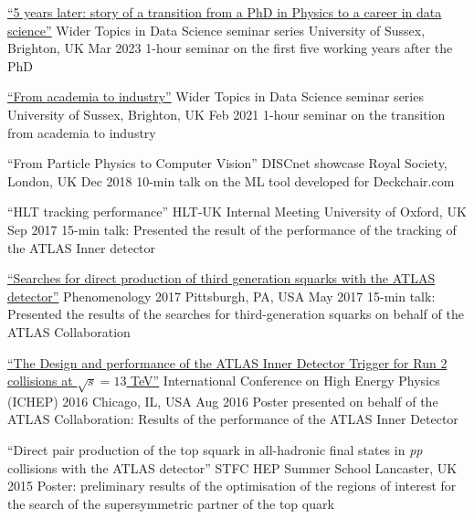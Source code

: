 \begin{cventries}
  \cventry
    {\href{https://www.linkedin.com/in/fabriziomiano/}{``5 years later: story of a transition from a PhD in Physics to a career in data science''}}
    {Wider Topics in Data Science seminar series}
    {University of Sussex, Brighton, UK}
    {Mar 2023}
    {1-hour seminar on the first five working years after the PhD}

  \cventry
    {\href{https://www.linkedin.com/in/fabriziomiano/}{``From academia to industry''}}
    {Wider Topics in Data Science seminar series}
    {University of Sussex, Brighton, UK}
    {Feb 2021}
    {1-hour seminar on the transition from academia to industry}

  \cventry
    {``From Particle Physics to Computer Vision''}
    {DISCnet showcase}
    {Royal Society, London, UK}
    {Dec 2018}
    {10-min talk on the ML tool developed for Deckchair.com}

  \cventry
    {``HLT tracking performance''}
    {HLT-UK Internal Meeting}
    {University of Oxford, UK}
    {Sep 2017}
    {15-min talk: Presented the result of the performance of the tracking of the ATLAS Inner detector}

  \cventry
    {
    \href{http://cds.cern.ch/record/2263055/files/ATL-PHYS-SLIDE-2017-220.pdf}{``Searches for direct production of third generation squarks with the ATLAS detector''}
    }
    {Phenomenology 2017}
    {Pittsburgh, PA, USA}
    {May 2017}
    {15-min talk: Presented the results of the searches for third-generation squarks on behalf of the ATLAS Collaboration}

  \cventry
    {
    \href{https://indico.cern.ch/event/432527/contributions/1071672/attachments/1317672/1974610/FMiano-IDTrigger-ICHEP.pdf}
    {``The Design and performance of the ATLAS Inner Detector Trigger for Run 2 collisions at $\sqrt{s} = 13$ TeV''}
    }
    {International Conference on High Energy Physics (ICHEP) 2016}
    {Chicago, IL, USA}
    {Aug 2016}
    {Poster presented on behalf of the ATLAS Collaboration: Results of the performance of the ATLAS Inner Detector}

  \cventry
    {``Direct pair production of the top squark in all-hadronic final states in \emph{pp} collisions with the ATLAS detector''}
    {STFC HEP Summer School}
    {Lancaster, UK}
    {2015}
    {Poster: preliminary results of the optimisation of the regions of interest for the search of the supersymmetric partner of the top quark}
\end{cventries}